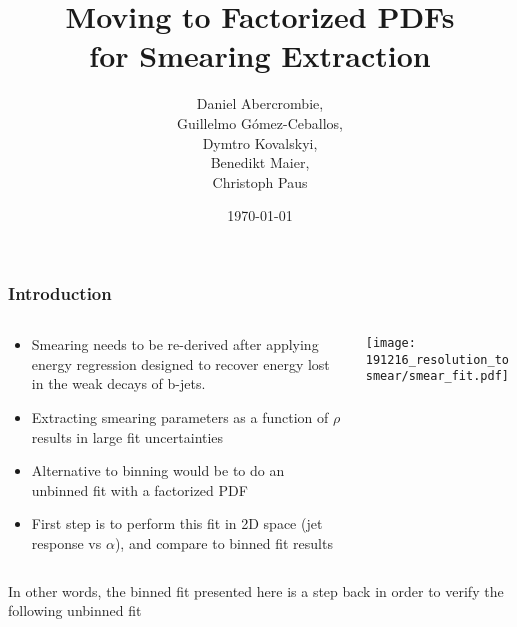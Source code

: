 \documentclass{beamer}
\author[D. Abercrombie]{
  Daniel Abercrombie, \\
  Guillelmo G\'omez-Ceballos, \\
  Dymtro Kovalskyi, \\
  Benedikt Maier, \\
  Christoph Paus
}
\title{\bf \sffamily Moving to Factorized PDFs \\ for Smearing Extraction}
\date{\today}
\begin{document}
\begin{frame}
  \titlepage
\end{frame}

\begin{frame}
  \frametitle{Introduction}

  \begin{columns}
    \begin{column}{0.6\linewidth}
      \begin{itemize}
      \item Smearing needs to be re-derived after applying
        energy regression designed to recover energy
        lost in the weak decays of b-jets.
      \item Extracting smearing parameters as a function of $\rho$
        results in large fit uncertainties
      \item Alternative to binning would be to do
        an unbinned fit with a factorized PDF
      \item First step is to perform this fit in 2D space
        (jet response vs $\alpha$), and compare to binned fit results
      \end{itemize}
    \end{column}
    \begin{column}{0.4\linewidth}
      \texttt{[image: 191216\_resolution\_tosmear/smear\_fit.pdf]}
    \end{column}
  \end{columns}

  \vfill
  In other words, the binned fit presented here is a step back
  in order to verify the following unbinned fit

\end{frame}
\end{document}
